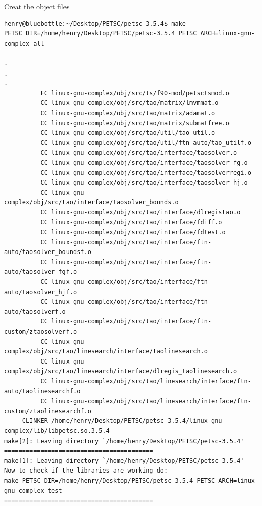 \documentclass{article}
\begin{document}
\normalsize
Creat the object files
\scriptsize
\begin{verbatim}
henry@bluebottle:~/Desktop/PETSC/petsc-3.5.4$ make PETSC_DIR=/home/henry/Desktop/PETSC/petsc-3.5.4 PETSC_ARCH=linux-gnu-complex all
  
.
.
.
          FC linux-gnu-complex/obj/src/ts/f90-mod/petsctsmod.o
          CC linux-gnu-complex/obj/src/tao/matrix/lmvmmat.o
          CC linux-gnu-complex/obj/src/tao/matrix/adamat.o
          CC linux-gnu-complex/obj/src/tao/matrix/submatfree.o
          CC linux-gnu-complex/obj/src/tao/util/tao_util.o
          CC linux-gnu-complex/obj/src/tao/util/ftn-auto/tao_utilf.o
          CC linux-gnu-complex/obj/src/tao/interface/taosolver.o
          CC linux-gnu-complex/obj/src/tao/interface/taosolver_fg.o
          CC linux-gnu-complex/obj/src/tao/interface/taosolverregi.o
          CC linux-gnu-complex/obj/src/tao/interface/taosolver_hj.o
          CC linux-gnu-complex/obj/src/tao/interface/taosolver_bounds.o
          CC linux-gnu-complex/obj/src/tao/interface/dlregistao.o
          CC linux-gnu-complex/obj/src/tao/interface/fdiff.o
          CC linux-gnu-complex/obj/src/tao/interface/fdtest.o
          CC linux-gnu-complex/obj/src/tao/interface/ftn-auto/taosolver_boundsf.o
          CC linux-gnu-complex/obj/src/tao/interface/ftn-auto/taosolver_fgf.o
          CC linux-gnu-complex/obj/src/tao/interface/ftn-auto/taosolver_hjf.o
          CC linux-gnu-complex/obj/src/tao/interface/ftn-auto/taosolverf.o
          CC linux-gnu-complex/obj/src/tao/interface/ftn-custom/ztaosolverf.o
          CC linux-gnu-complex/obj/src/tao/linesearch/interface/taolinesearch.o
          CC linux-gnu-complex/obj/src/tao/linesearch/interface/dlregis_taolinesearch.o
          CC linux-gnu-complex/obj/src/tao/linesearch/interface/ftn-auto/taolinesearchf.o
          CC linux-gnu-complex/obj/src/tao/linesearch/interface/ftn-custom/ztaolinesearchf.o
     CLINKER /home/henry/Desktop/PETSC/petsc-3.5.4/linux-gnu-complex/lib/libpetsc.so.3.5.4
make[2]: Leaving directory `/home/henry/Desktop/PETSC/petsc-3.5.4'
=========================================
make[1]: Leaving directory `/home/henry/Desktop/PETSC/petsc-3.5.4'
Now to check if the libraries are working do:
make PETSC_DIR=/home/henry/Desktop/PETSC/petsc-3.5.4 PETSC_ARCH=linux-gnu-complex test
=========================================
\end{verbatim}
\normalsize
\end{document}
